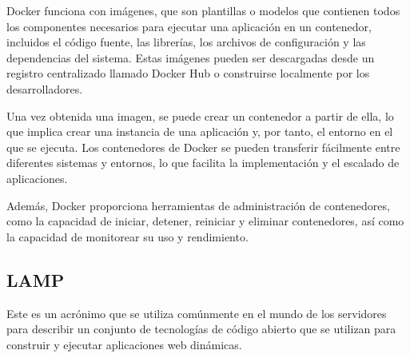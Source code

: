             Docker funciona con imágenes, que son plantillas o modelos que contienen todos los componentes necesarios para ejecutar una aplicación en un contenedor, incluidos el código fuente, las librerías, los archivos de configuración y las dependencias del sistema. Estas imágenes pueden ser descargadas desde un registro centralizado llamado Docker Hub o construirse localmente por los desarrolladores.
            
            Una vez obtenida una imagen, se puede crear un contenedor a partir de ella, lo que implica crear una instancia de una aplicación y, por tanto, el entorno en el que se ejecuta. Los contenedores de Docker se pueden transferir fácilmente entre diferentes sistemas y entornos, lo que facilita la implementación y el escalado de aplicaciones.
            
            Además, Docker proporciona herramientas de administración de contenedores, como la capacidad de iniciar, detener, reiniciar y eliminar contenedores, así como la capacidad de monitorear su uso y rendimiento.
            
            \newpage

        \subsection{LAMP}

            Este es un acrónimo que se utiliza comúnmente en el mundo de los servidores para describir un conjunto de tecnologías de código abierto que se utilizan para construir y ejecutar aplicaciones web dinámicas.

